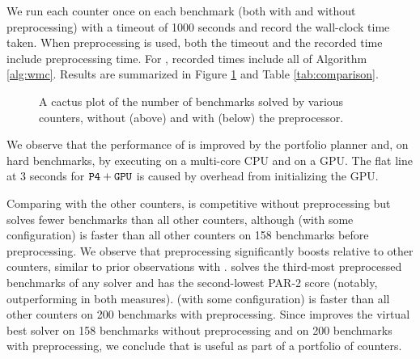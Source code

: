 We run each counter once on each benchmark (both with and without  preprocessing) with a timeout of 1000 seconds and record the wall-clock time taken. When preprocessing is used, both the timeout and the recorded time include preprocessing time. For , recorded times include all of Algorithm \ref{alg:wmc}. Results are summarized in Figure \ref{fig:parallel:comparison} and Table \ref{tab:comparison}. 

\begin{figure}[t]
\begin{center}

%
\vspace*{-0.5cm}
\caption{\label{fig:parallel:comparison} A cactus plot of the number of benchmarks solved by various counters, without (above) and with (below) the  \cite{LM14} preprocessor.}
\end{center}
\vspace*{-0.8cm}
\end{figure}

We observe that the performance of  is improved by the portfolio planner and, on hard benchmarks, by executing on a multi-core CPU and on a GPU. The flat line at 3 seconds for $\texttt{\upshape P4}+\texttt{\upshape GPU}$ is caused by overhead from initializing the GPU.



Comparing  with the other counters,  is competitive without preprocessing but solves fewer benchmarks than all other counters, although  (with some configuration) is faster than all other counters on 158 benchmarks before preprocessing. 
We observe that preprocessing significantly boosts  relative to other counters, similar to prior observations with  \cite{FHZ19}.  solves the third-most preprocessed benchmarks of any solver and has the second-lowest PAR-2 score (notably, outperforming  in both measures).  (with some configuration) is faster than all other counters on 200 benchmarks with preprocessing. Since  improves the virtual best solver on 158 benchmarks without preprocessing and on 200 benchmarks with preprocessing, we conclude that  is useful as part of a portfolio of counters.

